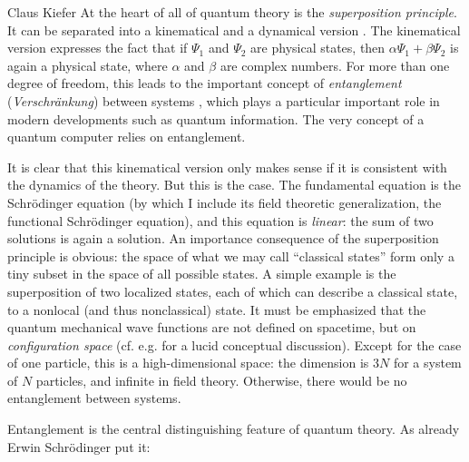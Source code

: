 \begin{artengenv}{Claus Kiefer}
At the heart of all of quantum theory is the {\em superposition
  principle}. It can be separated into a kinematical and a dynamical
version \parencite{joos_decoherence_2003}. The kinematical version expresses the fact that if
$\Psi_1$ and $\Psi_2$ are physical states, then 
$\alpha\Psi_1+\beta\Psi_2$ is again a physical state, where $\alpha$
and $\beta$ are complex numbers.  
For more than one degree of freedom, this leads to the important
concept of
{\em entanglement} ({\em Verschr\"ankung}) between systems \parencite{kiefer_albert_2015},
which plays a particular important role in modern developments
such as quantum information. The very concept of a quantum computer
relies on entanglement. 

It is clear that this kinematical version only makes sense if it is
consistent with the dynamics of the theory. But this is the case. The
fundamental equation is the Schr\"odinger equation (by which I include
its field theoretic generalization, the functional Schr\"odinger
equation), and this equation is {\em linear}: the sum of two
  solutions is again a solution. An importance consequence of the
  superposition principle is obvious: the space of what we may call 
``classical states'' form only a tiny subset in the space of all
possible states. A simple example is the superposition of two
localized states, each of which can describe a classical state, to a
nonlocal (and thus nonclassical) state. It must be emphasized that the
quantum mechanical wave functions are not defined on spacetime, but on
{\em configuration space} (cf. e.g. \cite{zeh_strange_2016} for a lucid conceptual
discussion). Except for the case of one particle, this is a
high-dimensional space: the dimension is $3N$ for a system of $N$
particles, and infinite in field theory.
Otherwise, there would be no entanglement between systems.

Entanglement is the central distinguishing feature of quantum theory.
As already Erwin Schr\"odinger \parencite*[p.~555]{schrodinger_discussion_1935} put it:



\end{artengenv}
